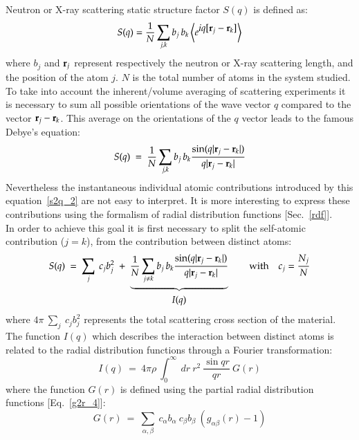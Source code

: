 Neutron or X-ray scattering static structure factor $S(q)$ is defined as:
\begin{equation}
\label{s2q_1}
S(q)=\frac{1}{N} \sum_{j,k} b_j\,b_k \left< e^{\displaystyle{iq[{\bf{r}}_j-{\bf{r}}_k]}} \right>
\end{equation}
where $b_j$ and ${\bf{r}}_j$ represent respectively the neutron or X-ray scattering length, and the position of the atom $j$. 
$N$ is the total number of atoms in the system studied. \\
To take into account the inherent/volume averaging of scattering experiments it is necessary to sum all possible orientations of the wave vector $q$ compared to the vector ${\bf{r}}_j-{\bf{r}}_k$.
This average on the orientations of the $q$ vector leads to the famous Debye's equation:
\begin{equation}
\label{s2q_2}
S(q)\ =\ \frac{1}{N} \sum_{j,k} b_j\,b_k \frac{\sin (q|{\bf{r}}_j-{\bf{r}}_k|)}{q|{\bf{r}}_j-{\bf{r}}_k|}
\end{equation} 
Nevertheless the instantaneous individual atomic contributions introduced by this equation~\ref{s2q_2} are not easy to interpret. 
It is more interesting to express these contributions using the formalism of radial distribution functions [Sec.~\ref{rdf}]. \\
In order to achieve this goal it is first necessary to split the self-atomic contribution ($j=k$), from the contribution between distinct atoms:
\begin{equation}
\label{s2q_3}
	S(q)\ =\ \sum_{j}\ c_j b_j^2\ +\ \underbrace{\frac{1}{N} \sum_{j\ne k} b_j\,b_k \frac{\sin (q|{\bf{r}}_j-{\bf{r}}_k|)}{q|{\bf{r}}_j-{\bf{r}}_k|}}_{\displaystyle{I(q)}} \qquad \text{with}\quad c_j=\frac{N_j}{N}
\end{equation}
where $4\pi\ \sum_{j}\ c_j b_j^2$ represents the total scattering cross section of the material. \\
The function $I(q)$ which describes the interaction between distinct atoms is related to the radial distribution functions through a Fourier transformation:
\begin{equation}
\label{s2q_4}
I(q)\ =\  4 \pi \rho\ \int_{0}^{\infty}\ dr\ r^{2}\ \frac{\sin qr}{qr}\ G(r)
\end{equation}
where the function $G(r)$ is defined using the partial radial distribution functions [Eq.~\ref{g2r_4}]:
\begin{equation}
\label{s2q_5}
G(r)\ =\ \sum_{\alpha,\beta}\ c_{\alpha} b_{\alpha}\ c_{\beta} b_{\beta}\ (g_{\alpha\beta}(r) -1)
\end{equation}
